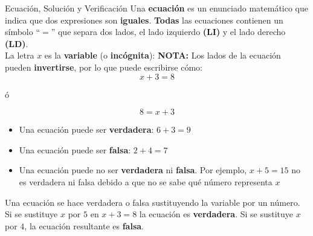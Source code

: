 \documentclass[12pt, letterpaper]{article}
\begin{document}
	\begin{concepto}{Ecuación, Solución y Verificación}
		Una \textbf{ecuación} es un enunciado matemático que indica que dos
		expresiones son \textbf{iguales}. \textbf{Todas} las ecuaciones contienen un símbolo ``$=$'' que separa dos lados, el lado izquierdo \textbf{(LI)} y el lado derecho \textbf{(LD)}.\\
		La letra $x$ es la \textbf{variable} (o \textbf{incógnita}):
		\textbf{NOTA:} Los lados de la ecuación pueden \textbf{invertirse}, por lo que puede escribirse cómo:
		$$x+3=8$$
		\begin{center}
			ó
		\end{center}
		$$8=x+3$$
		
		\vspace{0.4cm}
		\begin{center}
		\end{center}
		\vspace{0.3cm}
		
		\begin{itemize}
			\item Una ecuación puede ser \textbf{verdadera}: $6+3=9$
			\item Una ecuación puede ser \textbf{falsa}: $2+4=7$
			\item Una ecuación puede no ser \textbf{verdadera} ni \textbf{falsa}. Por ejemplo, $x+5=15$ no es verdadera ni falsa debido a que no se sabe qué número representa \textbf{$x$}
		\end{itemize}
		
		\vspace{0.3cm}
		Una ecuación se hace verdadera o falsa sustituyendo la variable por un número. Si se sustituye $x$ por $5$ en $x+3=8$ la ecuación es \textbf{verdadera}. Si se sustituye $x$ por $4$, la ecuación resultante es \textbf{falsa}.\\
		

\end{concepto}
\end{document}
